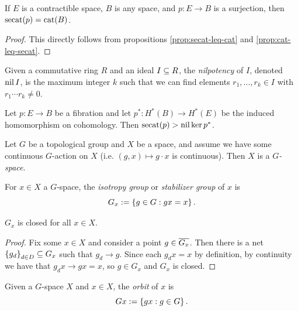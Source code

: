 \begin{corollary}
    If $E$ is a contractible space, $B$ is any space, and $p : E \to B$ is a surjection, then $\operatorname{secat}(p) = \operatorname{cat}(B)$.
    \begin{proof}
        This directly follows from propositions \ref{prop:secat-leq-cat} and \ref{prop:cat-leq-secat}.
    \end{proof}
\end{corollary}

\begin{definition}
    Given a commutative ring $R$ and an ideal $I \subseteq R$, the \emph{nilpotency} of $I$, denoted $\operatorname{nil} I$, is the maximum integer $k$ such that we can find elements $r_1,...,r_k \in I$ with $r_1 \cdots r_k \neq 0$.
\end{definition}

\begin{proposition}\label{prop:nil-leq-secat}
    Let $p : E \to B$ be a fibration and let $p^* : H^*(B) \to H^*(E)$ be the induced homomorphism on cohomology.
    Then $\operatorname{secat}(p) > \operatorname{nil} \ker p^*$.
\end{proposition}

\begin{definition}
        Let $G$ be a topological group and $X$ be a space, and assume we have some continuous $G$-action on $X$ (i.e. $(g,x) \mapsto g \cdot x$ is continuous).
        Then $X$ is a \emph{$G$-space}.
\end{definition}

\begin{definition}
    For $x \in X$ a $G$-space, the \emph{isotropy group} or \emph{stabilizer group} of $x$ is
    \[
        G_x := \left\{ g \in G : gx = x \right\}.
    \]
\end{definition}

\begin{remark}
    $G_x$ is closed for all $x \in X$.
    \begin{proof}
        Fix some $x \in X$ and consider a point $g \in \overline{G_x}$.
        Then there is a net $\left\{ g_d \right\}_{d \in D} \subseteq G_x$ such that $g_d \to g$.
        Since each $g_d x = x$ by definition, by continuity we have that $g_d x \to g x = x$, so $g \in G_x$ and $G_x$ is closed.
    \end{proof}
\end{remark}

\begin{definition}
    Given a $G$-space $X$ and $x \in X$, the \emph{orbit} of $x$ is
    \[
        Gx := \left\{ gx : g \in G \right\}.
    \]
\end{definition}

